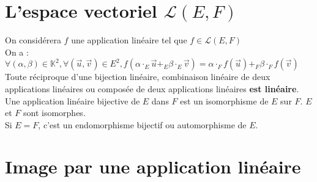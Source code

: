 \section{L'espace vectoriel $\mathcal{L}(E, F)$}\label{sec:l'espace-vectoriel-$mathcal{l}(e-f)$}
  
  On considérera $f$ une application linéaire tel que $f \in \mathcal{L}(E, F)$\\
  On a : $\forall (\alpha, \beta) \in \mathbb{K}^2, \forall (\vec u, \vec v) \in E^2, f(\alpha \cdot_E \vec u +_E  \beta \cdot_E \vec v) = \alpha \cdot_F f(\vec u) +_F \beta \cdot_F f(\vec v)$\\
  
  Toute réciproque d'une bijection linéaire, combinaison linéaire de deux applications linéaires ou composée de deux applications linéaires \textbf{est linéaire}.\\
  Une application linéaire bijective de $E$ dans $F$ est un isomorphisme de $E$ sur $F$.
  $E$ et $F$ sont isomorphes.\\
  Si $E = F$, c'est un endomorphisme bijectif ou automorphisme de $E$.


\section{Image par une application linéaire}\label{sec:image-par-une-application-lineaire}
  
  
